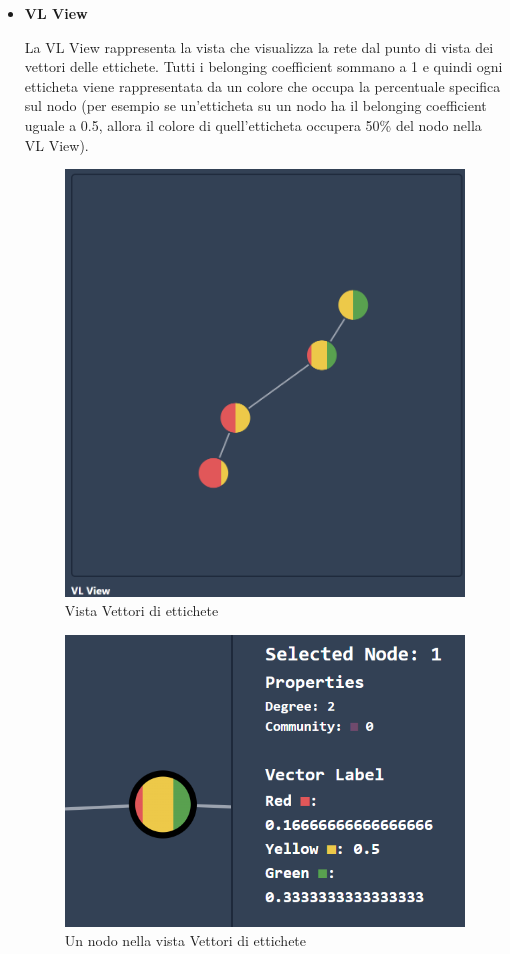 \documentclass[a4paper,12pt]{report}
\begin{document}
\begin{itemize}
			\item \textbf{VL View} 

			La VL View rappresenta la vista che visualizza la rete dal punto di vista dei vettori delle ettichete. Tutti i belonging coefficient sommano a 1 e quindi ogni etticheta viene rappresentata da un colore che occupa la percentuale specifica sul nodo (per esempio se un'etticheta su un nodo ha il belonging coefficient uguale a 0.5, allora il colore di quell'etticheta occupera 50\% del nodo nella VL View). 
			
			\begin{center}
			\begin{figure}[H]
			\centering
			\includegraphics[width=0.9\linewidth,keepaspectratio]{vlview}
			\caption{Vista Vettori di ettichete}
			\end{figure}
			\end{center}

			\begin{center}
			\begin{figure}[H]
			\centering
			\includegraphics[width=0.8\linewidth,keepaspectratio]{vlrep}
			\caption{Un nodo nella vista Vettori di ettichete}
			\label{fig:vlrep}
			\end{figure}
			\end{center}


\end{itemize}
\end{document}
